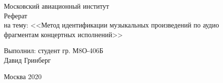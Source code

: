 \begin{center}

\large Московский авиационный институт\\[5.5cm]

\huge Реферат \\[0.6cm] %
\large на тему:  <<Метод идентификации музыкальных
произведений по аудио фрагментам концертных исполнений>>\\[3.7cm]


\end{center}

\begin{flushright}
Выполнил: студент гр. М8О-406Б \\
Давид Гринберг \\
\end{flushright}


\vfill

\begin{center}
\large Москва 2020
\end{center}

\thispagestyle{empty}